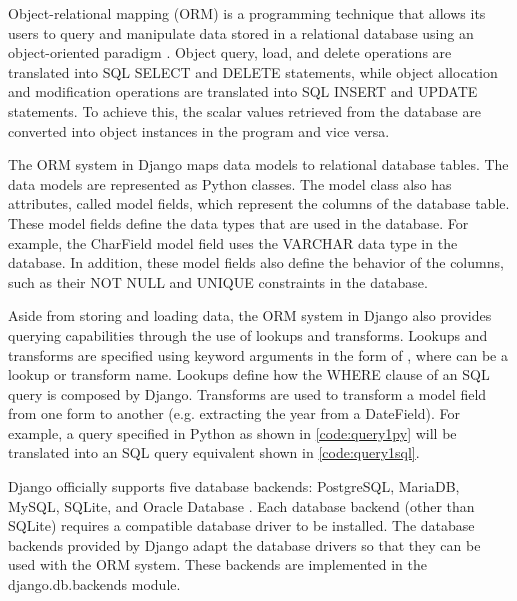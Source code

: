 Object-relational mapping (ORM) is a programming technique that allows its
users to query and manipulate data stored in a relational database using an
object-oriented paradigm \cite{linskey:orm}. Object query, load, and delete
operations are translated into SQL SELECT and DELETE statements, while object
allocation and modification operations are translated into SQL INSERT and
UPDATE statements. To achieve this, the scalar values retrieved from the
database are converted into object instances in the program and vice versa.

The ORM system in Django maps data models to relational database tables. The
data models are represented as Python classes. The model class also has
attributes, called model fields, which represent the columns of the database
table. These model fields define the data types that are used in the database.
For example, the CharField model field uses the VARCHAR data type in the
database. In addition, these model fields also define the behavior of the
columns, such as their NOT NULL and UNIQUE constraints in the database.

Aside from storing and loading data, the ORM system in Django also provides
querying capabilities through the use of lookups and transforms. Lookups and
transforms are specified using keyword arguments in the form of
, where  can be a lookup or
transform name. Lookups define how the WHERE clause of an SQL query is composed
by Django. Transforms are used to transform a model field from one form to
another (e.g. extracting the year from a DateField). For example, a query
specified in Python as shown in \autoref{code:query1py} will be translated into
an SQL query equivalent shown in \autoref{code:query1sql}.





Django officially supports five database backends: PostgreSQL, MariaDB, MySQL,
SQLite, and Oracle Database \cite{django:databases}. Each database backend
(other than SQLite) requires a compatible database driver to be installed. The
database backends provided by Django adapt the database drivers so that they
can be used with the ORM system. These backends are implemented in the
django.db.backends module.


